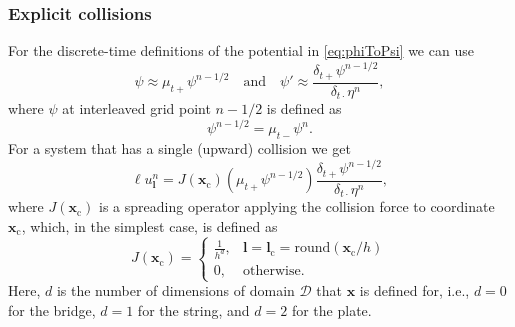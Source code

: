 \documentclass[dvipsnames, pdftex]{article}
\begin{document}
\subsubsection{Explicit collisions}
For the discrete-time definitions of the potential in \eqref{eq:phiToPsi} we can use 
\begin{equation}
    \psi\approx \mu_{t+}\psi^{n-1/2}\quad \text{and} \quad \psi' \approx \frac{\delta_{t+}\psi^{n-1/2}}{\delta_{t\cdot}\eta^n},
\end{equation}
where $\psi$ at interleaved grid point $n-1/2$ is defined as
\begin{equation}
    \psi^{n-1/2} = \mu_{t-}\psi^n.
\end{equation}
For a system that has a single (upward) collision we get
\begin{equation}\label{eq:dummySystem}
    \ell u^n_{\boldsymbol{l}} = J(\boldsymbol{x}_\text{c})\left(\mu_{t+}\psi^{n-1/2}\right)\frac{\delta_{t+}\psi^{n-1/2}}{\delta_{t\cdot}\eta^n},
\end{equation}
where $J(\boldsymbol{x}_\text{c})$ is a spreading operator applying the collision force to coordinate $\boldsymbol{x}_\text{c}$, which, in the simplest case, is defined as \cite{bilbao2009numerical}
\begin{equation}
   J(\boldsymbol{x}_\text{c}) = \begin{cases}
       \frac{1}{h^d}, & \boldsymbol{l} = \boldsymbol{l}_\text{c} = \text{round}(\boldsymbol{x}_\text{c} / h)\\
       0, & \text{otherwise}.
   \end{cases}
\end{equation}
Here, $d$ is the number of dimensions of domain $\mathcal{D}$ that $\boldsymbol{x}$ is defined for, i.e., $d=0$ for the bridge, $d=1$ for the string, and $d=2$ for the plate.
\end{document}
